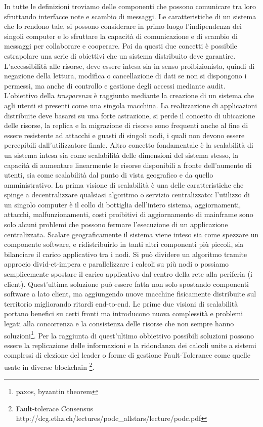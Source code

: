 	
\iffalse	
	In tutte le definizioni troviamo delle componenti che possono comunicare tra loro sfruttando interfacce note e scambio di messaggi.
	Le caratteristiche di un sistema che lo rendono tale, si possono considerare in primo luogo l'indipendenza dei singoli computer e lo sfruttare la capacità di comunicazione e di scambio di messaggi per collaborare e cooperare. 
	Poi da questi due concetti è possibile estrapolare una serie di obiettivi che un sistema distribuito deve garantire. 
	L'accessibilità alle risorse,  deve essere intesa sia in senso proibizionista, quindi di negazione della lettura, modifica o cancellazione di dati se non si dispongono i permessi, ma anche di controllo e gestione degli accessi mediante audit. 
	L'obiettivo della \textit{trasparenza} è raggiunto mediante la creazione di un sistema che agli utenti si presenti come una singola macchina. La realizzazione di applicazioni distribuite deve basarsi su una forte astrazione, si perde il concetto di ubicazione delle risorse, la replica e la migrazione di risorse sono frequenti anche al fine di essere resistente ad attacchi e guasti di singoli nodi, i quali non devono essere percepibili dall'utilizzatore finale. Altro concetto fondamentale è la scalabilità di un sistema intesa sia come scalabilità delle dimensioni del sistema stesso, la capacità di aumentare linearmente le risorse disponibili a fronte dell'aumento di utenti, sia come scalabilità dal punto di vista geografico e da quello amministrativo. 
	La prima visione di scalabilità è una delle caratteristiche che spinge a decentralizzare qualsiasi algoritmo o servizio centralizzato: l'utilizzo di un singolo computer è il collo di bottiglia dell'intero sistema, aggiornamenti, attacchi, malfunzionamenti, costi proibitivi di aggiornamento di mainframe sono solo alcuni problemi che possono fermare l'esecuzione di un applicazione centralizzata. 
	Scalare geograficamente il sistema viene inteso sia come spezzare un componente software, e ridistribuirlo in tanti altri componenti più piccoli, sia bilanciare il carico applicativo tra i nodi. Si può dividere un algoritmo tramite approcio divid-et-impera e parallelizzare i calcoli su più nodi o possiamo semplicemente spostare il carico applicativo dal centro della rete alla periferia (i client). Quest'ultima soluzione può essere fatta non solo spostando componenti software a lato client, ma aggiungendo nuove macchine fisicamente distribuite sul territorio migliorando ritardi end-to-end. Le prime due visioni di scalabilità portano benefici su certi fronti ma introducono nuova complessità e problemi legati alla concorrenza e la consistenza delle risorse che non sempre hanno soluzioni\footnote{paxos, byzantin theorem}.
	Per la raggiunta di quest'ultimo obbiettivo possibili soluzioni possono essere la replicazione delle informazioni e la ridondanza dei calcoli unite a sistemi complessi di elezione del leader o forme di gestione Fault-Tolerance come quelle usate in diverse blockchain \footnote{Fault-tolerace Consensus http://dcg.ethz.ch/lectures/podc\_allstars/lecture/podc.pdf}.
	
